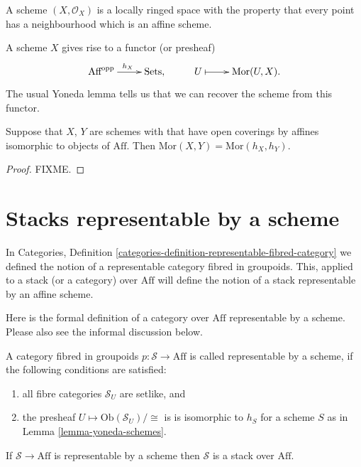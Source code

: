 \medskip\noindent
A scheme $(X,\mathcal{O}_X)$ is a locally ringed space
with the property that every point has a neighbourhood which is an
affine scheme.

\medskip\noindent
A scheme $X$ gives rise to a functor (or presheaf)
$$
\xymatrix{
\text{Aff}^{\text{opp}} \ar[r]^{h_X} & \text{Sets}, &
U \ar@{|->}[r] & \text{Mor}(U, X).}
$$
The usual Yoneda lemma tells us that we can recover the scheme from this
functor. 

\begin{lemma}
\label{lemma-yoneda-schemes}
Suppose that $X$, $Y$ are schemes with that have open coverings
by affines isomorphic to objects of $\text{Aff}$. Then $\text{Mor}(X,Y)
= \text{Mor}(h_X, h_Y)$.
\end{lemma}

\begin{proof}
FIXME.
\end{proof}

\section{Stacks representable by a scheme}
\label{section-stack-representable-by-scheme}

\noindent
In Categories, Definition
\ref{categories-definition-representable-fibred-category} we
defined the notion of a representable category fibred in groupoids. This,
applied to a stack (or a category) over $\text{Aff}$ will define the notion of
a stack representable by an affine scheme. 

\medskip\noindent
Here is the formal definition of a category over $\text{Aff}$ representable by
a scheme. Please also see the informal discussion below.

\begin{definition}
\label{definition-representable-by-scheme}
A category fibred in groupoids $p : \mathcal{S} \to \text{Aff}$ is
called representable by a scheme, if the following conditions are satisfied:
\begin{enumerate}
\item all fibre categories $\mathcal{S}_U$ are setlike, and
\item the presheaf $U \mapsto \text{Ob}(\mathcal{S}_U)/\cong$ is 
is isomorphic to $h_S$ for a scheme $S$ as in
Lemma \ref{lemma-yoneda-schemes}.
\end{enumerate}
\end{definition}

\begin{lemma}
\label{lemma-representable-by-scheme-implies-stack}
If $\mathcal{S} \to \text{Aff}$ is representable by a scheme then $\mathcal{S}$
is a stack over $\text{Aff}$.
\end{lemma}

